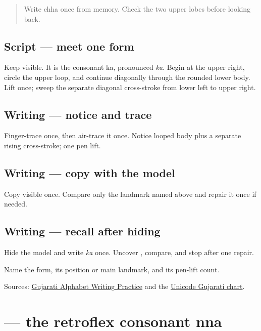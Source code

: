 \label{lesson:GU-W03-ka}



\begin{quote}
Write chha once from memory. Check the two upper lobes before looking back.
\end{quote}

\subsection*{Script — meet one form}
Keep \textbf{} visible. It is the consonant ka, pronounced \emph{ka}. Begin at the upper right, circle the upper loop, and continue diagonally through the rounded lower body. Lift once; sweep the separate diagonal cross-stroke from lower left to upper right.

\subsection*{Writing — notice and trace}

Finger-trace \textbf{} once, then air-trace it once. Notice looped body plus a separate rising cross-stroke; one pen lift.

\subsection*{Writing — copy with the model}
Copy visible \textbf{} once. Compare only the landmark named above and repair it once if needed.

\subsection*{Writing — recall after hiding}
Hide the model and write \emph{ka} once. Uncover \textbf{}, compare, and stop after one repair.

\begin{tcolorbox}[breakable,colback=teal!4,colframe=teal!35!black,title={Before you move on}]
Name the form, its position or main landmark, and its pen-lift count.

Sources: \href{https://www.t30apps.com/gujarati-alphabet-writing/}{Gujarati Alphabet Writing Practice} and the \href{https://www.unicode.org/charts/PDF/U0A80.pdf}{Unicode Gujarati chart}.
\end{tcolorbox}
\section[\texorpdfstring{\gu{ણ} (ṇa)}{ણ (ṇa)}]{ — the retroflex consonant nna}

